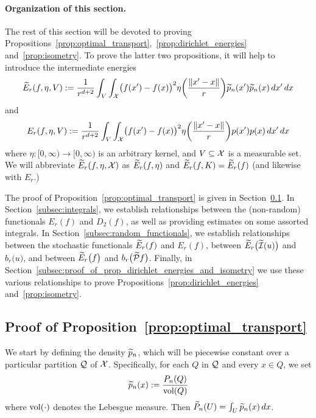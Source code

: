 \paragraph{Organization of this section.}
The rest of this section will be devoted to proving Propositions~\ref{prop:optimal_transport},~\ref{prop:dirichlet_energies} and~\ref{prop:isometry}. To prove the latter two propositions, it will help to introduce the intermediate energies
\begin{equation*}
\widetilde{E}_r(f,\eta,V) := \frac{1}{r^{d + 2}}\int_{V} \int_{\mathcal{X}} \bigl(f(x') - f(x)\bigr)^2 \eta\biggl(\frac{\|x' - x\|}{r}\biggr) \widetilde{p}_n(x') \widetilde{p}_n(x) \,dx' \,dx
\end{equation*}
and
\begin{equation*}
{E}_r(f,\eta,V) := \frac{1}{r^{d + 2}}\int_{V} \int_{\mathcal{X}} \bigl(f(x') - f(x)\bigr)^2 \eta\biggl(\frac{\|x' - x\|}{r}\biggr) p(x') p(x) \,dx' \,dx
\end{equation*}
where $\eta: [0,\infty) \to [0,\infty)$ is an arbitrary kernel, and $V \subseteq \mathcal{X}$ is a measurable set. We will abbreviate $\widetilde{E}_r(f,\eta,\mathcal{X})$ as $\widetilde{E}_r(f,\eta)$ and $\widetilde{E}_r(f,K) = \widetilde{E}_r(f)$ (and likewise with $E_r$.)

The proof of Proposition~\ref{prop:optimal_transport} is given in Section~\ref{subsec:proof_proposition_optimal_transport}. In Section~\ref{subsec:integrals}, we establish relationships between the (non-random) functionals $E_r(f)$ and $D_2(f)$, as well as providing estimates on some assorted integrals. In Section~\ref{subsec:random_functionals}, we establish relationships between the stochastic functionals $\widetilde{E}_r(f)$ and $E_r(f)$,  between $\widetilde{E}_r\bigl(\widetilde{\mathcal{I}}(u)\bigr)$ and $b_r\bigl(u\bigr)$, and between $\widetilde{E}_r\bigl(f\bigr)$ and $b_r\bigl(\widetilde{\mathcal{P}}f\bigr)$. Finally, in Section~\ref{subsec:proof_of_prop_dirichlet_energies_and_isometry} we use these various relationships to prove Propositions~\ref{prop:dirichlet_energies} and~\ref{prop:isometry}.

\subsection{Proof of Proposition~\ref{prop:optimal_transport}}
\label{subsec:proof_proposition_optimal_transport}

We start by defining the density $\widetilde{p}_n$, which will be piecewise constant over a particular partition $\mathcal{Q}$ of $\mathcal{X}$. Specifically, for each $Q$ in $\mathcal{Q}$ and every $x \in Q$, we set
\begin{equation}
\label{pf:prop_optimal_transport_0}
\widetilde{p}_n(x) := \frac{P_n(Q)}{\text{vol}(Q)}
\end{equation}
where $\text{vol}(\cdot)$ denotes the Lebesgue measure. Then $\widetilde{P}_n(U) = \int_{U} \widetilde{p}_n(x) \,dx$.

